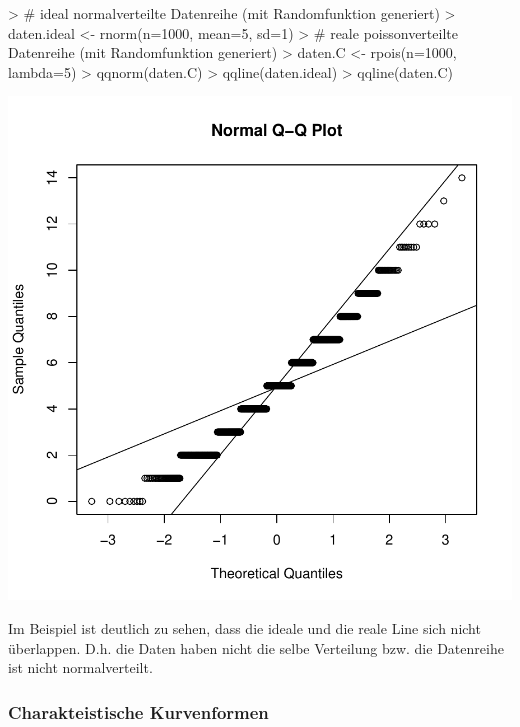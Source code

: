 \begin{Schunk}
\begin{Sinput}
> # ideal normalverteilte Datenreihe (mit Randomfunktion generiert)
> daten.ideal <- rnorm(n=1000, mean=5, sd=1)
> # reale poissonverteilte Datenreihe (mit Randomfunktion generiert)
> daten.C <- rpois(n=1000, lambda=5)
> qqnorm(daten.C)
> qqline(daten.ideal)
> qqline(daten.C)
\end{Sinput}
\end{Schunk}
\includegraphics{definitionen-031}

\noindent
Im Beispiel ist deutlich zu sehen, dass die ideale und die reale Line 
sich nicht überlappen. D.h. die Daten haben nicht die selbe Verteilung
bzw. die Datenreihe ist nicht normalverteilt.

\subsubsection{Charakteistische Kurvenformen}

